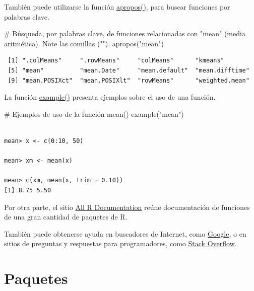 \documentclass[
  letterpaper,
  DIV=11,
  numbers=noendperiod]{scrreprt}
\newenvironment{Shaded}{\begin{snugshade}}{\end{snugshade}}
\newcommand{\CommentTok}[1]{\textcolor[rgb]{0.37,0.37,0.37}{#1}}
\newcommand{\FunctionTok}[1]{\textcolor[rgb]{0.28,0.35,0.67}{#1}}
\newcommand{\NormalTok}[1]{\textcolor[rgb]{0.00,0.23,0.31}{#1}}
\newcommand{\StringTok}[1]{\textcolor[rgb]{0.13,0.47,0.30}{#1}}
\begin{document}
También puede utilizarse la función
\href{https://rdrr.io/r/utils/apropos.html}{apropos()}, para buscar
funciones por palabras clave.

\begin{Shaded}
\begin{Highlighting}[]
\CommentTok{\# Búsqueda, por palabras clave, de funciones relacionadas con "mean" (media aritmética). Note las comillas ("").}
\FunctionTok{apropos}\NormalTok{(}\StringTok{"mean"}\NormalTok{)}
\end{Highlighting}
\end{Shaded}

\begin{verbatim}
 [1] ".colMeans"     ".rowMeans"     "colMeans"      "kmeans"       
 [5] "mean"          "mean.Date"     "mean.default"  "mean.difftime"
 [9] "mean.POSIXct"  "mean.POSIXlt"  "rowMeans"      "weighted.mean"
\end{verbatim}

La función \href{https://rdrr.io/r/utils/example.html}{example()}
presenta ejemplos sobre el uso de una función.

\begin{Shaded}
\begin{Highlighting}[]
\CommentTok{\# Ejemplos de uso de la función mean()}
\FunctionTok{example}\NormalTok{(}\StringTok{"mean"}\NormalTok{)}
\end{Highlighting}
\end{Shaded}

\begin{verbatim}

mean> x <- c(0:10, 50)

mean> xm <- mean(x)

mean> c(xm, mean(x, trim = 0.10))
[1] 8.75 5.50
\end{verbatim}

Por otra parte, el sitio \href{https://rdrr.io/r/}{All R Documentation}
reúne documentación de funciones de una gran cantidad de paquetes de R.

También puede obtenerse ayuda en buscadores de Internet, como
\href{https://www.google.com/}{Google}, o en sitios de preguntas y
respuestas para programadores, como
\href{https://stackoverflow.com/}{Stack Overflow}.

\hypertarget{paquetes}{%
\section{Paquetes}\label{paquetes}}
\end{document}

